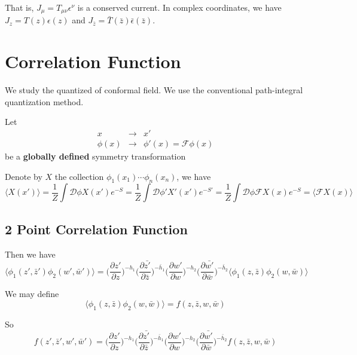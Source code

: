 \documentclass[12pt]{book}
\begin{document}
	That is, $J_\mu=T_{\mu\nu}\epsilon^\nu$ is a conserved current.	In complex coordinates, we have $J_z=T(z)\epsilon(z)$ and $J_{\bar z}=\bar T(\bar z)\bar \epsilon(\bar z)$.
		
	\section{Correlation Function}
	
	We study the quantized of conformal field. We use the conventional path-integral quantization method.
	
	Let
	\begin{eqnarray}
		x&\rightarrow& x'\\
		\phi(x) &\rightarrow& \phi'(x)=\mathcal F \phi(x)
	\end{eqnarray}
	be a {\bf globally defined} symmetry transformation
	
	Denote by $X$ the collection $\phi_1(x_1)\cdots\phi_n(x_n)$, we have 
	\begin{equation}
		\langle X(x')\rangle=\frac 1Z\int\mathcal D \phi X(x')e^{-S}=\frac 1Z\int\mathcal D \phi' X'(x')e^{-S'}=\frac 1Z\int\mathcal D \phi \mathcal FX(x)e^{-S}=\langle \mathcal FX(x)\rangle \label{eqn:quan_sym}
	\end{equation}
	
	\subsection{2 Point Correlation Function}
	Then we have
	\begin{equation}
		\langle \phi_1(z',\bar z')\phi_2(w',\bar w')\rangle=\bigg(\frac {\partial z'}{\partial z}\bigg)^{-h_1}\bigg(\frac {\partial \bar{z'}}{\partial \bar z}\bigg)^{-\bar h_1}\bigg(\frac {\partial w'}{\partial w}\bigg)^{-h_2}\bigg(\frac {\partial \bar{w'}}{\partial \bar w}\bigg)^{-\bar h_2}\langle \phi_1(z,\bar z)\phi_2(w,\bar w)\rangle
	\end{equation}
	
	We may define
	\begin{equation}
		\langle \phi_1(z,\bar z)\phi_2(w,\bar w)\rangle=f(z,\bar z,w,\bar w)
	\end{equation}
	
	So
	\begin{equation}
		f(z',\bar z',w',\bar w')=\bigg(\frac {\partial z'}{\partial z}\bigg)^{-h_1}\bigg(\frac {\partial \bar{z'}}{\partial \bar z}\bigg)^{-\bar h_1}\bigg(\frac {\partial w'}{\partial w}\bigg)^{-h_2}\bigg(\frac {\partial \bar{w'}}{\partial \bar w}\bigg)^{-\bar h_2}f(z,\bar z,w,\bar w)
	\end{equation}
		
\end{document}
